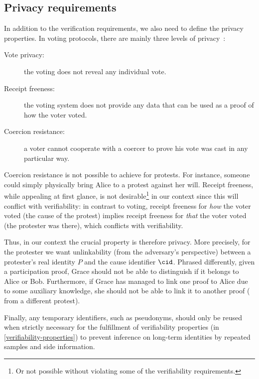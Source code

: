 \subsection{Privacy requirements}%
\label{privacy-properties}

In addition to the verification requirements, we also need to define the privacy properties.
In voting protocols, there are mainly three levels of privacy~\cite{VerifyingPrivacyPropertiesOfVotingProtocols}:
\begin{description}
  \item[Vote privacy:] the voting does not reveal any individual vote.
  \item[Receipt freeness:] the voting system does not provide any data that can be used as a proof of how the voter voted.
  \item[Coercion resistance:] a voter cannot cooperate with a coercer to prove his vote was cast in any particular way.
\end{description}

Coercion resistance is not possible to achieve for protests.
For instance, someone could simply physically bring Alice to a protest against her will.
Receipt freeness, while appealing at first glance, is not desirable\footnote{%
  Or not possible without violating some of the verifiability 
  requirements.
} in our context since this will conflict with verifiability: in contrast to 
voting, receipt freeness for \emph{how} the voter voted (\ie the cause of the 
protest) implies receipt freeness for \emph{that} the voter voted (\ie the 
protester was there), which conflicts with verifiability.

Thus, in our context the crucial property is therefore privacy.
More precisely, for the protester we want unlinkability (from the adversary's 
perspective) between a protester's real identity \(P\) and the cause identifier 
\(\cid\).
Phrased differently, given a participation proof, Grace should not be able to 
distinguish if it belongs to Alice or Bob.
Furthermore, if Grace has managed to link one proof to Alice due to some 
auxiliary knowledge, she should not be able to link it to another proof (\eg 
from a different protest).

Finally, any temporary identifiers, such as pseudonyms, should only be reused 
when strictly necessary for the fulfillment of verifiability properties (in 
\cref{verifiability-properties}) to prevent inference on long-term identities 
by repeated samples and side information.

